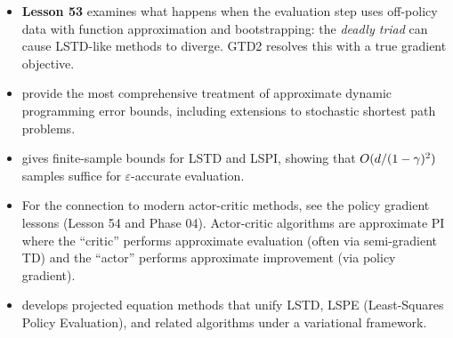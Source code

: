 \documentclass[11pt,a4paper]{article}
\begin{document}
\begin{itemize}
  \item \textbf{Lesson 53} examines what happens when the evaluation
    step uses off-policy data with function approximation and
    bootstrapping: the \emph{deadly triad} can cause LSTD-like
    methods to diverge. GTD2 resolves this with a true gradient
    objective.

  \item \citet[Chapters 5--6]{bertsekas1996} provide the most
    comprehensive treatment of approximate dynamic programming error
    bounds, including extensions to stochastic shortest path problems.

  \item \citet[Chapter 3]{szepesvari2010} gives finite-sample bounds
    for LSTD and LSPI, showing that $O(d/(1-\gamma)^2)$ samples
    suffice for $\varepsilon$-accurate evaluation.

  \item For the connection to modern actor-critic methods, see the
    policy gradient lessons (Lesson 54 and Phase 04). Actor-critic
    algorithms are approximate PI where the ``critic'' performs
    approximate evaluation (often via semi-gradient TD) and the
    ``actor'' performs approximate improvement (via policy gradient).

  \item \citet{bertsekas2009} develops projected equation methods
    that unify LSTD, LSPE (Least-Squares Policy Evaluation), and
    related algorithms under a variational framework.
\end{itemize}


\end{document}
